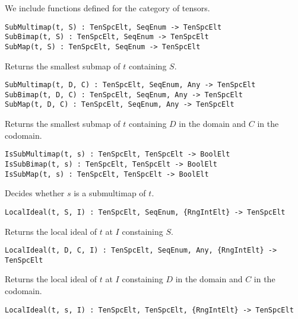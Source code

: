 \documentclass{amsart}
\begin{document}
We include functions defined for the category of tensors.

\color{blue}
{\small \begin{verbatim}
SubMultimap(t, S) : TenSpcElt, SeqEnum -> TenSpcElt
SubBimap(t, S) : TenSpcElt, SeqEnum -> TenSpcElt
SubMap(t, S) : TenSpcElt, SeqEnum -> TenSpcElt
\end{verbatim} }
\color{black}

Returns the smallest submap of $t$ containing $S$.

\color{blue}
{\small \begin{verbatim}
SubMultimap(t, D, C) : TenSpcElt, SeqEnum, Any -> TenSpcElt
SubBimap(t, D, C) : TenSpcElt, SeqEnum, Any -> TenSpcElt
SubMap(t, D, C) : TenSpcElt, SeqEnum, Any -> TenSpcElt
\end{verbatim} }
\color{black}

Returns the smallest submap of $t$ containing $D$ in the domain and $C$ in the 
codomain.

\color{blue}
{\small \begin{verbatim}
IsSubMultimap(t, s) : TenSpcElt, TenSpcElt -> BoolElt
IsSubBimap(t, s) : TenSpcElt, TenSpcElt -> BoolElt
IsSubMap(t, s) : TenSpcElt, TenSpcElt -> BoolElt
\end{verbatim} }
\color{black}

Decides whether $s$ is a submultimap of $t$.

\color{blue}
{\small \begin{verbatim}
LocalIdeal(t, S, I) : TenSpcElt, SeqEnum, {RngIntElt} -> TenSpcElt
\end{verbatim} }
\color{black}

Returns the local ideal of $t$ at $I$ constaining $S$.

\color{blue}
{\small \begin{verbatim}
LocalIdeal(t, D, C, I) : TenSpcElt, SeqEnum, Any, {RngIntElt} -> TenSpcElt
\end{verbatim} }
\color{black}

Returns the local ideal of $t$ at $I$ constaining $D$ in the domain and $C$ 
in the codomain.

\color{blue}
{\small \begin{verbatim}
LocalIdeal(t, s, I) : TenSpcElt, TenSpcElt, {RngIntElt} -> TenSpcElt
\end{verbatim} }
\color{black}
\end{document}
